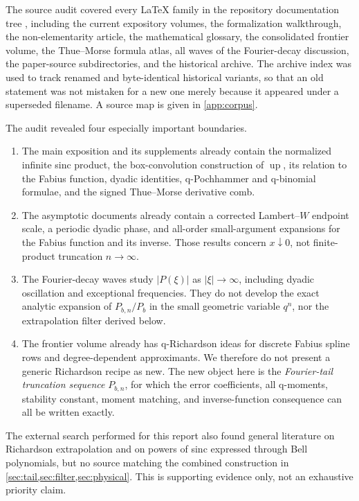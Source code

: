 \documentclass[11pt]{article}
\theoremstyle{definition}
\theoremstyle{remark}
\newcommand{\up}{\operatorname{up}}
\newcommand{\abs}[1]{\left\lvert #1\right\rvert}
\begin{document}
The source audit covered every LaTeX family in the repository documentation tree
\cite{repo}, including the current expository volumes, the formalization walkthrough, the
non-elementarity article, the mathematical glossary, the consolidated frontier
volume, the Thue--Morse formula atlas, all waves of the Fourier-decay discussion,
the paper-source subdirectories, and the historical archive. The archive index
was used to track renamed and byte-identical historical variants, so that an old
statement was not mistaken for a new one merely because it appeared under a
superseded filename. A source map is given in \cref{app:corpus}.

The audit revealed four especially important boundaries.

\begin{enumerate}[label=\textbf{B\arabic*.},leftmargin=12mm]
\item The main exposition and its supplements already contain the normalized
infinite sinc product, the box-convolution construction of \(\up\), its relation
to the Fabius function, dyadic identities, q-Pochhammer and q-binomial formulae,
and the signed Thue--Morse derivative comb.

\item The asymptotic documents already contain a corrected Lambert--\(W\)
endpoint scale, a periodic dyadic phase, and all-order small-argument expansions
for the Fabius function and its inverse. Those results concern
\(x\downarrow0\), not finite-product truncation \(n\to\infty\).

\item The Fourier-decay waves study \(\abs{P(\xi)}\) as
\(\abs{\xi}\to\infty\), including dyadic oscillation and exceptional
frequencies. They do not develop the exact analytic expansion of
\(P_{b,n}/P_b\) in the small geometric variable \(q^n\), nor the extrapolation
filter derived below.

\item The frontier volume already has q-Richardson ideas for discrete Fabius
spline rows and degree-dependent approximants. We therefore do not present a
generic Richardson recipe as new. The new object here is the \emph{Fourier-tail
truncation sequence} \(P_{b,n}\), for which the error coefficients, all q-moments,
stability constant, moment matching, and inverse-function consequence can all be
written exactly.
\end{enumerate}

The external search performed for this report also found general literature on
Richardson extrapolation and on powers of sinc expressed through Bell
polynomials, but no source matching the combined construction in
\cref{sec:tail,sec:filter,sec:physical}. This is supporting evidence only, not an
exhaustive priority claim.
\end{document}
